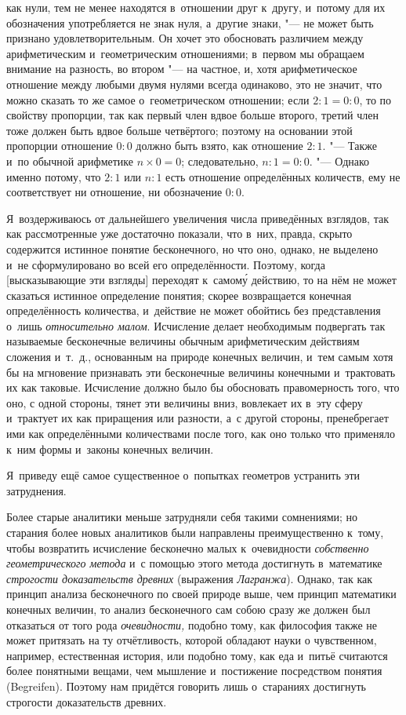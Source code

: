 как нули, тем не менее находятся в~отношении друг к~другу, и~потому для их
обозначения употребляется не знак нуля, а~другие знаки, "--- не может быть
признано удовлетворительным. Он хочет это обосновать различием между
арифметическим и~геометрическим отношениями; в~первом мы обращаем внимание на
разность, во втором "--- на частное, и, хотя арифметическое отношение между
любыми двумя нулями всегда одинаково, это не значит, что можно сказать то же
самое о~геометрическом отношении; если $2:1=0:0$, то по свойству
пропорции, так как первый член вдвое больше второго, третий член тоже должен
быть вдвое больше четвёртого; поэтому на основании этой пропорции отношение
$0:0$ должно быть взято, как отношение $2:1$. "--- Также и~по обычной
арифметике $n\times 0=0$; следовательно, $n:1=0:0$. "--- Однако именно
потому, что $2:1$ или $n:1$ есть отношение определённых количеств, ему не
соответствует ни отношение, ни обозначение $0:0$.

Я~воздерживаюсь от дальнейшего увеличения числа приведённых взглядов, так как
рассмотренные уже достаточно показали, что в~них, правда, скрыто содержится
истинное понятие бесконечного, но что оно, однако, не выделено и~не
сформулировано во всей его определённости. Поэтому, когда [высказывающие эти
взгляды] переходят к~самом\'{у} действию, то на нём не может сказаться истинное
определение понятия; скорее возвращается конечная определённость
количества, и~действие не может обойтись без представления о~лишь
{\em относительно малом}. Исчисление делает необходимым подвергать так
называемые бесконечные величины обычным арифметическим действиям сложения
и~т.~д., основанным на природе конечных величин, и~тем самым хотя бы на
мгновение признавать эти бесконечные величины конечными и~трактовать их как
таковые. Исчисление должно было бы обосновать правомерность того, что оно, с
одной стороны, тянет эти величины вниз, вовлекает их в~эту сферу и~трактует их
как приращения или разности, а~с другой стороны, пренебрегает ими как
определёнными количествами после того, как оно только что применяло к~ним формы
и~законы конечных величин.

Я~приведу ещё самое существенное о~попытках геометров устранить эти
затруднения.

Более старые аналитики меньше затрудняли себя такими сомнениями; но старания
более новых аналитиков были направлены преимущественно к~тому, чтобы возвратить
исчисление бесконечно малых к~очевидности
{\em собственно геометрического метода} и~с помощью этого метода достигнуть
в~математике {\em строгости доказательств древних} (выражения {\em Лагранжа}).
Однако, так как принцип анализа бесконечного по своей природе выше, чем принцип
математики конечных величин, то анализ бесконечного сам собою сразу же должен
был отказаться от того рода {\em очевидности,} подобно тому, как философия
также не может притязать на ту отчётливость, которой обладают науки о
чувственном, например, естественная история, или подобно тому, как еда и~питьё
считаются более понятными вещами, чем мышление и~постижение посредством понятия
(Be\-grei\-fen). Поэтому нам придётся говорить лишь о~стараниях достигнуть
строгости доказательств древних.

